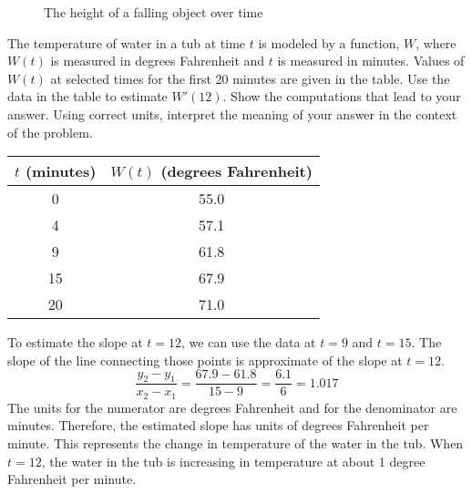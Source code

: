 \begin{figure}[htbp]
    \centering
    \caption{The height of a falling object over time}
    \label{fig:falling}
\end{figure}

\begin{Exercise} The temperature of water in a tub 
	at time $t$ is modeled by a function, $W$, where $W(t)$ is measured in degrees 
	Fahrenheit and $t$ is measured in minutes. Values of $W(t)$ at selected times 
	for the first 20 minutes are given in the table. Use the data in the table to 
	estimate $W'(12)$. Show the computations that lead to your answer. Using 
	correct units, interpret the meaning of your answer in the context of the 
	problem. \\
	\begin{tabular}{c|c}\hline
	$t$ (minutes) & $W(t)$ (degrees Fahrenheit)\\
	\hline
	0 & 55.0\\
	\hline
	4 & 57.1\\
	\hline
	9 & 61.8\\
	\hline
	15 & 67.9\\
	\hline
	20 & 71.0\\
	\hline
	\end{tabular}	 
\end{Exercise}

\begin{Answer}[ref=slope1]
	To estimate the slope at $t = 12$, we can use the data at $t = 9$ and $t = 
	15$. The slope of the line connecting those points is approximate of the 
	slope at $t = 12$. $$\frac{y_2 - y_1}{x_2 - x_1} = \frac{67.9 - 61.8}{15 - 9} 
	= \frac{6.1}{6} = 1.017$$ The units for the numerator are degrees Fahrenheit 
	and for the denominator are minutes. Therefore, the estimated slope has units 
	of degrees Fahrenheit per minute. This represents the change in temperature 
	of the water in the tub. When $t = 12$, the water in the tub is increasing in 
	temperature at about 1 degree Fahrenheit per minute. 
\end{Answer}

